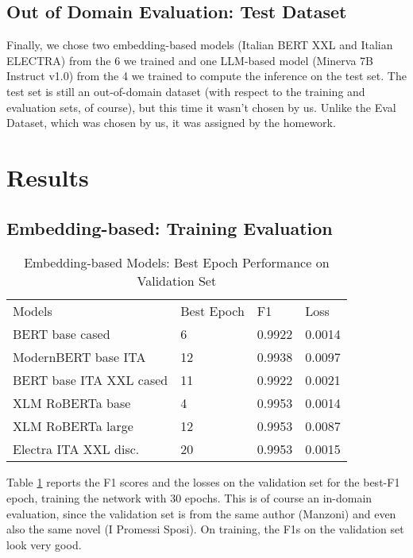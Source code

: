 \documentclass[11pt]{article}
\begin{document}
\subsection{Out of Domain Evaluation: Test Dataset}
Finally, we chose two embedding-based models (Italian BERT XXL and Italian ELECTRA) from the 6 we trained and one LLM-based model (Minerva 7B Instruct v1.0) from the 4 we trained to compute the inference on the test set. \newline The test set is still an out-of-domain dataset (with respect to the training and evaluation sets, of course), but this time it wasn't chosen by us. Unlike the Eval Dataset, which was chosen by us, it was assigned by the homework.

\section{Results}

\subsection{Embedding-based: Training Evaluation}
\begin{table}[]
	\small
	\caption{Embedding-based Models: Best Epoch Performance on Validation Set}
	\begin{tabular}{llll}
		Models & Best Epoch & F1 & Loss \\
		BERT base cased & 6      & 0.9922        & 0.0014                  \\
		ModernBERT base ITA  & 12      & 0.9938        & 0.0097                  \\
		BERT base ITA XXL cased & 11      & 0.9922        & 0.0021                 \\
		XLM RoBERTa base & 4       & 0.9953        & 0.0014                  \\
		XLM RoBERTa large & 12       & 0.9953       & 0.0087                 \\
		Electra ITA XXL disc. & 20       & 0.9953        & 0.0015                \\
	\end{tabular}
	\label{t1}
\end{table}
Table \ref{t1} reports the F1 scores and the losses on the validation set for the best-F1 epoch, training the network with 30 epochs. \newline This is of course an in-domain evaluation, since the validation set is from the same author (Manzoni) and even also the same novel (I Promessi Sposi). \newline On training, the F1s on the validation set look very good.
\end{document}
